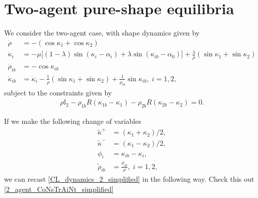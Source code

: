 \section{Two-agent pure-shape equilibria}
We consider the two-agent case, with shape dynamics given by
\begin{align}
\label{CL_dynamics_2_simplified}
\dot{\rho} &= - (\cos\kappa_1 + \cos\kappa_2) \nonumber \\
\dot{\kappa}_i &= - \mu \Big[(1 - \lambda)\sin(\kappa_i - \alpha_i) + \lambda \sin(\kappa_{ib} - \alpha_0) \Big] + \frac{\lambda}{\rho}(\sin\kappa_1 + \sin\kappa_2) \nonumber \\
\dot{\rho}_{ib} &= - \cos\kappa_{ib} \nonumber \\
\dot{\kappa}_{ib} &= \dot{\kappa}_i - \frac{1}{\rho}(\sin\kappa_1 + \sin\kappa_2) + \frac{1}{\rho_{ib}} \sin\kappa_{ib},  \; i=1,2,
\end{align}
subject to the constraints given by
\begin{align}
\rho \mathbb{I}_2 - \rho_{1b} R(\kappa_{1b} - \kappa_1) - \rho_{2b} R(\kappa_{2b} - \kappa_{2}) = 0. 
\label{2_agent_CoNsTrAiNt_simplified}
\end{align}

If we make the following change of variables
\begin{align}
\tilde{\kappa}^+ &= (\kappa_1 + \kappa_2)/2, \nonumber \\
\tilde{\kappa}^- &= (\kappa_1 - \kappa_2)/2, \nonumber \\
\phi_{i} &= \kappa_{ib} - \kappa_i, \nonumber \\
\tilde{\rho}_{ib} &= \frac{\rho_{ib} }{\rho}, \; i=1,2,
\end{align}
we can recast \eqref{CL_dynamics_2_simplified} in the following way. Check this out \eqref{2_agent_CoNsTrAiNt_simplified}
  
  
  
  
  
  
  
  
  
  
  
  
  
  
  
  
  